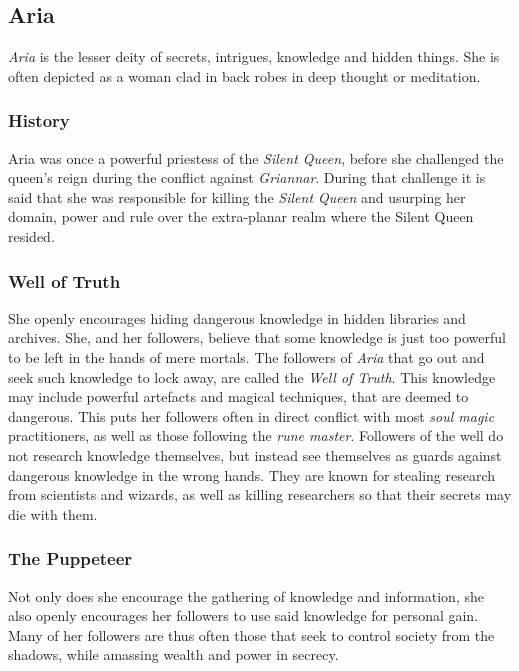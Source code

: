 \subsection*{Aria}


\emph{Aria} is the lesser deity of secrets, intrigues, knowledge and hidden
things. She is often depicted as a woman clad in back robes in deep thought
or meditation.

\subsubsection*{History}

Aria was once a powerful priestess of the \emph{Silent Queen}, before she
challenged the queen's reign during the conflict against \emph{Griannar}.
During that challenge it is said that she was responsible for killing the
\emph{Silent Queen} and usurping her domain, power and rule over the
extra-planar realm where the Silent Queen resided.

\subsubsection*{Well of Truth}

She openly encourages hiding dangerous knowledge in hidden libraries and
archives. She, and her followers, believe that some knowledge is just too
powerful to be left in the hands of mere mortals. The followers of \emph{Aria}
that go out and seek such knowledge to lock away, are called the \emph{Well of
  Truth}. This knowledge may include powerful artefacts and magical
techniques, that are deemed to dangerous. This puts her followers often in
direct conflict with most \emph{soul magic} practitioners, as well as those
following the \emph{rune master}. Followers of the well do not research
knowledge themselves, but instead see themselves as guards against dangerous
knowledge in the wrong hands. They are known for stealing research from
scientists and wizards, as well as killing researchers so that their secrets
may die with them.

\subsubsection*{The Puppeteer}

Not only does she encourage the gathering of knowledge and information, she
also openly encourages her followers to use said knowledge for personal gain.
Many of her followers are thus often those that seek to control society from
the shadows, while amassing wealth and power in secrecy.

